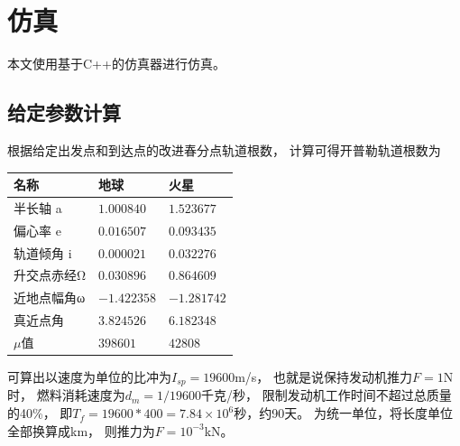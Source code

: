 \section{仿真}
本文使用基于C++的仿真器\cite{olzhn2021}进行仿真。

\subsection{给定参数计算}
根据给定出发点和到达点的改进春分点轨道根数，
计算可得开普勒轨道根数为
\begin{center}\begin{tabular}{lll}
    \toprule
    名称 & 地球 & 火星 \\
    \midrule
    半长轴    a & $ 1.000840$ & $ 1.523677$ \\
    偏心率    e & $ 0.016507$ & $ 0.093435$ \\
    轨道倾角  i & $ 0.000021$ & $ 0.032276$ \\
    升交点赤经Ω & $ 0.030896$ & $ 0.864609$ \\
    近地点幅角ω & $-1.422358$ & $-1.281742$ \\
    真近点角    & $ 3.824526$ & $ 6.182348$ \\
    $\mu$值     & $398601   $ & $42808    $ \\
    \bottomrule
\end{tabular}\end{center}
可算出以速度为单位的比冲为$I_{sp}=19600$m/s，
也就是说保持发动机推力$F=1$N时，
燃料消耗速度为$d_m=1/19600$千克/秒，
限制发动机工作时间不超过总质量的40\%，
即$T_f=19600*400=7.84\times10^6$秒，约90天。
为统一单位，将长度单位全部换算成km，
则推力为$F=10^{-3}$kN。

